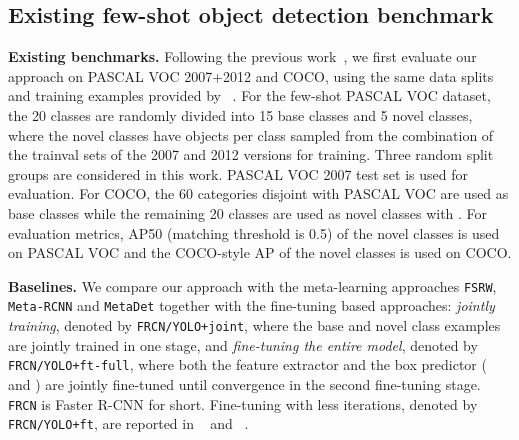 \documentclass{article}
\newcommand\minisection[1]{\vspace{1mm}\noindent \textbf{#1}}
\begin{document}
\subsection{Existing few-shot object detection benchmark}
\label{sec:exist_benchmark}
\minisection{Existing benchmarks.} 
Following the previous work~\cite{kang2019few,yan2019meta,wang2019meta}, we 
first evaluate our approach on PASCAL VOC 2007+2012 and COCO, using the same data splits and training examples provided by ~\citet{kang2019few}.
For the few-shot PASCAL VOC dataset,  the 20 classes are randomly divided into 15 base classes and 5 novel classes, where the novel classes have  objects per class sampled from the combination of the trainval sets of the 2007 and 2012 versions for training. Three random split groups are considered in this work. PASCAL VOC 2007 test set is used for evaluation. For COCO, the 60 categories disjoint with PASCAL VOC are used as base classes while the remaining 20 classes are used as novel classes with .  For evaluation metrics, AP50 (matching threshold is 0.5) of the novel classes is used on PASCAL VOC and the COCO-style AP of the novel classes is used on COCO. 


\minisection{Baselines.} We compare our approach with the meta-learning approaches \texttt{FSRW}, \texttt{Meta-RCNN} and \texttt{MetaDet} together with the fine-tuning
based approaches:  \emph{jointly training}, denoted by \texttt{FRCN/YOLO+joint}, where the base and novel class examples are jointly trained in one stage,  and \emph{fine-tuning the entire model}, denoted by \texttt{FRCN/YOLO+ft-full}, where both the feature extractor  and the box predictor ( and ) are jointly fine-tuned until convergence in the second fine-tuning stage. \texttt{FRCN} is Faster R-CNN for short. Fine-tuning with less iterations, denoted by \texttt{FRCN/YOLO+ft}, are reported in ~\citet{kang2019few} and ~\citet{yan2019meta}.
\end{document}

